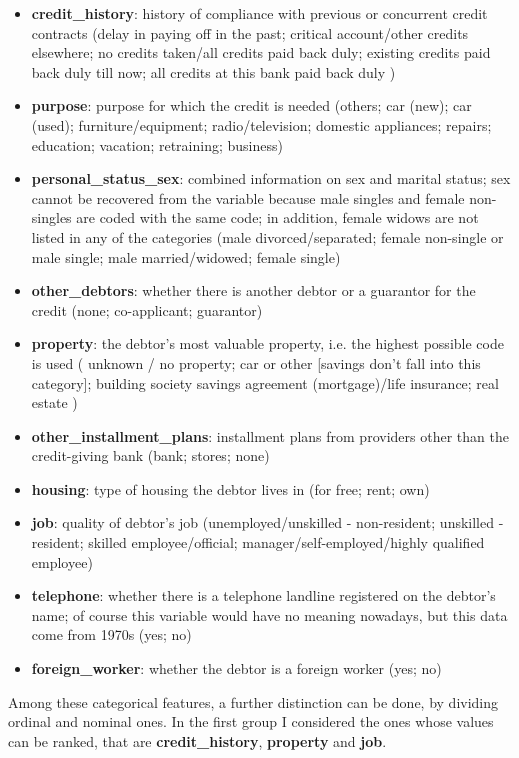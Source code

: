 \documentclass[letterpaper]{article}
\begin{document}
	\begin{itemize}
		\item \textbf{credit\_history}:  history of compliance with previous or concurrent credit contracts (delay in paying off in the past; critical account/other credits elsewhere; no credits taken/all credits paid back duly; existing credits paid back duly till now; all credits at this bank paid back duly )
		\item \textbf{purpose}:  purpose for which the credit is needed (others; car (new); car (used); furniture/equipment; radio/television; domestic appliances; repairs; education; vacation; retraining; business)
		\item \textbf{personal\_status\_sex}:  combined information on sex and marital status; sex cannot be recovered from the variable because male singles and female non-singles are coded with the same code; in addition, female widows are not listed in any of the categories (male divorced/separated; female non-single or male single; male married/widowed; female single)
		\item \textbf{other\_debtors}: whether there is another debtor or a guarantor for the credit (none; co-applicant; guarantor)
		\item \textbf{property}:  the debtor’s most valuable property, i.e. the highest possible code is used ( unknown / no property; car or other [savings don't fall into this category]; building society savings agreement (mortgage)/life insurance; real estate )
		\item \textbf{other\_installment\_plans}: installment plans from providers other than the credit-giving bank (bank; stores; none)
		\item \textbf{housing}:  type of housing the debtor lives in (for free; rent; own)
		\item \textbf{job}: quality of debtor’s job (unemployed/unskilled - non-resident; unskilled - resident; skilled employee/official; manager/self-employed/highly qualified employee)
		\item \textbf{telephone}:  whether there is a telephone landline registered on the debtor’s name; of course this variable would have no meaning nowadays, but this data come from 1970s (yes; no)
		\item \textbf{foreign\_worker}: whether the debtor is a foreign worker (yes; no)
	\end{itemize}	
	Among these categorical features, a further distinction can be done, by dividing ordinal and nominal ones. In the first group I considered the ones whose values can be ranked, that are \textbf{credit\_history}, \textbf{property} and \textbf{job}. 
	
\end{document}
